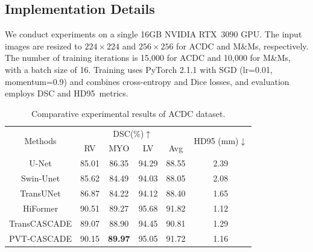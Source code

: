\documentclass[conference]{IEEEtran}
\begin{document}
\subsection{Implementation Details}
We conduct experiments on a single 16GB NVIDIA RTX~3090 GPU. The input images are resized to $224 \times 224$ and $256 \times 256$ for ACDC and M\&Ms, respectively. The number of training iterations is 15{,}000 for ACDC and 10{,}000 for M\&Ms, with a batch size of 16. Training uses PyTorch 2.1.1 with SGD (lr=0.01, momentum=0.9) and combines cross-entropy and Dice losses, and evaluation employs DSC and \mbox{HD95 metrics.}



\begin{table}[t]
\caption{Comparative experimental results of ACDC dataset.}
\label{acdc results}
\begin{center}
\setlength{\tabcolsep}{5pt} %
\renewcommand{\arraystretch}{1.1} %
\begin{tabular}{cccccc}
\hline
\multirow{2}{*}{Methods} & \multicolumn{4}{c}{DSC(\%)$\uparrow$}                                       & \multirow{2}{*}{HD95 (mm)$\downarrow$} \\
                         & RV             & MYO& LV             & Avg            &                            \\ \hline
U-Net\cite{ronnebergerUNetConvolutionalNetworks2015}                     & 85.01          & 86.35          & 94.29          & 88.55          & 2.39                       \\
Swin-Unet\cite{SwinUnetUnetlikePure2021a}                & 85.62          & 84.49          & 94.03          & 88.05          & 2.08                       \\
TransUNet\cite{TransUNetTransformersMake2021}                 & 86.87          & 84.22          & 94.12          & 88.40          & 1.65                       \\ \hline
HiFormer\cite{HiFormerHierarchicalMultiscale2023}                 & 90.51          & 89.27          & 95.68& 91.82& 1.12                       \\
TransCASCADE\cite{MedicalImageSegmentation2023}             & 89.07          & 88.90          & 94.45          & 90.81          & 1.29                       \\
PVT-CASCADE\cite{MedicalImageSegmentation2023}              & 90.15          & \textbf{89.97} & 95.05          & 91.72          & 1.16                       \\ \hline

\end{tabular}
\end{center}
\end{table}
\end{document}
